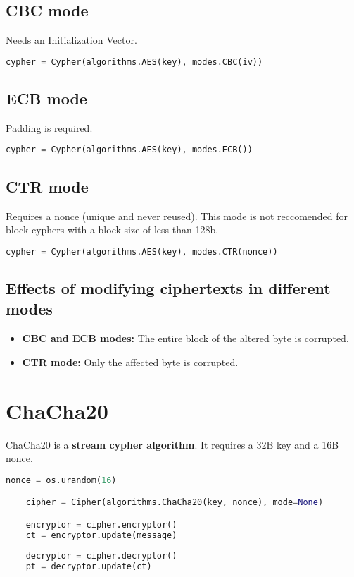 \documentclass[a4paper, 12 pt]{memoir}
\begin{document}
\subsection{CBC mode}
Needs an Initialization Vector.
\begin{lstlisting}[language=Python]
    cypher = Cypher(algorithms.AES(key), modes.CBC(iv))
\end{lstlisting}

\subsection{ECB mode}
Padding is required.
\begin{lstlisting}[language=Python]
    cypher = Cypher(algorithms.AES(key), modes.ECB())
\end{lstlisting}

\subsection{CTR mode}
\label{sec:AES256 CTR}
Requires a nonce (unique and never reused). This mode is not reccomended for block cyphers with a block size of less than 128b.
\begin{lstlisting}[language=Python]
    cypher = Cypher(algorithms.AES(key), modes.CTR(nonce))
\end{lstlisting}

\subsection{Effects of modifying ciphertexts in different modes}
\begin{itemize}
    \item \textbf{CBC and ECB modes:} The entire block of the altered byte is corrupted.
    \item \textbf{CTR mode:} Only the affected byte is corrupted.
\end{itemize}

\section{ChaCha20}
ChaCha20 is a \textbf{stream cypher algorithm}. It requires a 32B key and a 16B nonce.
\begin{lstlisting}[language=Python]
    nonce = os.urandom(16)

    cipher = Cipher(algorithms.ChaCha20(key, nonce), mode=None)

    encryptor = cipher.encryptor()
    ct = encryptor.update(message)
    
    decryptor = cipher.decryptor()
    pt = decryptor.update(ct)
\end{lstlisting}
\end{document}
